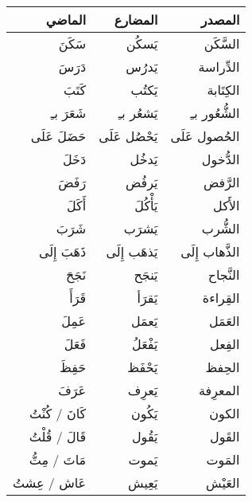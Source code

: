 \documentclass[a4paper]{article}
\begin{document}
\begin{tabular}{rrr}
  \hline
  \hline
  الماضي            &        المضارع         &           المصدر \\
  \hline
  \hline
  سَكَنَ               &         يَسكُن           &              السَّكَن \\
دَرَسَ               &        يَدرُس            &             الدِّراسة \\
كَتَبَ               &         يَكتُب           &               الكِتَابة \\
شَعَرَ بـِ            &         يَشعُر بـِ        &               الشُّعُور بـِ \\
حَضَلَ عَلَى           &      يَحْصُل عَلَى          &        الحُصول عَلَى \\
دَخَلَ               &          يَدخُل          &                الدُّخول \\
رَفَضَ               &        يَرفُض            &             الرَّفض \\
أَكَلَ               &           يَأْكُلَ         &                  الأَكل \\
شَرَبَ               &        يَشرَب            &              الشُّرب \\
ذَهَبَ إِلَى           &        يَذهَب إِلَى        &              الذَّهاب إِلَى  \\
نَجَحَ               &          يَنجَح          &                  النَّجاح \\
قَرَأَ               &           يَقرَأ         &                    القِراءة \\
عَمِلَ               &         يَعمَل           &                 العَمَل \\
فَعَلَ               &          يَفْعَلُ          &                  الفِعل \\
حَفِظَ               &         يَحْفَظ           &                 الحِفظ \\
عَرَفَ               &       يَعرِف             &              المعرِفة \\
كَانَ / كُنْتُ         &        يَكُون            &                الكون \\
قَالَ  / قُلْتُ        &         يَقُول           &                  القَول \\
مَاتَ / مِتُّ          &       يَموت             &               المَوت \\
عَاش / عِشتُ         &     يَعِيش               &             العَيْش \\

\end{tabular}
\end{document}
